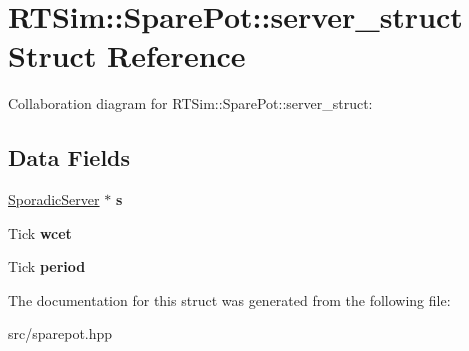\hypertarget{structRTSim_1_1SparePot_1_1server__struct}{}\section{R\+T\+Sim\+:\+:Spare\+Pot\+:\+:server\+\_\+struct Struct Reference}
\label{structRTSim_1_1SparePot_1_1server__struct}


Collaboration diagram for R\+T\+Sim\+:\+:Spare\+Pot\+:\+:server\+\_\+struct\+:
\subsection*{Data Fields}
\begin{DoxyCompactItemize}
\item 
\hyperlink{classRTSim_1_1SporadicServer}{Sporadic\+Server} $\ast$ {\bfseries s}\hypertarget{structRTSim_1_1SparePot_1_1server__struct_a47467cb8ca71eec03943b0ab6640b800}{}\label{structRTSim_1_1SparePot_1_1server__struct_a47467cb8ca71eec03943b0ab6640b800}

\item 
Tick {\bfseries wcet}\hypertarget{structRTSim_1_1SparePot_1_1server__struct_a1318886bea646e039e1b53c09e6a283f}{}\label{structRTSim_1_1SparePot_1_1server__struct_a1318886bea646e039e1b53c09e6a283f}

\item 
Tick {\bfseries period}\hypertarget{structRTSim_1_1SparePot_1_1server__struct_a86360a7f4a1ef4573d5614963e49cd63}{}\label{structRTSim_1_1SparePot_1_1server__struct_a86360a7f4a1ef4573d5614963e49cd63}

\end{DoxyCompactItemize}


The documentation for this struct was generated from the following file\+:\begin{DoxyCompactItemize}
\item 
src/sparepot.\+hpp\end{DoxyCompactItemize}
